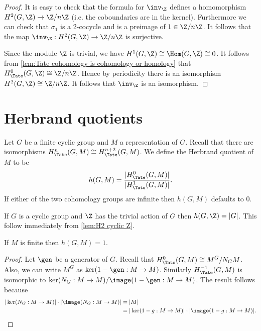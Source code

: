 \begin{proof}
	It is easy to check that the formula for $\inv_\Z$ defines a homomorphism
	$H^2(G,\Z) \to \Z / n \Z$ (i.e. the coboundaries are in the kernel).
	Furthermore we can check that $\sigma_1$ is a 2-cocycle
	and is a preimage of $1 \in \Z/n\Z$.
	It follows that the map $\inv_\Z : H^2(G,\Z) \to \Z/n\Z$ is surjective.

	Since the module $\Z$ is trivial, we have $H^1(G,\Z)\cong \Hom(G,\Z) \cong 0$.
	It follows from \ref{lem:Tate cohomology is cohomology or homology}
	that $H^0_{\Tate}(G,\Z) \cong \Z /n\Z$.
	Hence by periodicity there is an isomorphism $H^2(G,\Z) \cong \Z/ n\Z$.
	It follows that $\inv_\Z$ is an isomorphism.
\end{proof}





\section{Herbrand quotients}

\begin{definition} \label{def:herbrand quotient}
	Let $G$ be a finite cyclic group and $M$ a representation of $G$.
	Recall that there are isomorphisms $H^n_{\Tate}(G,M) \cong H^{n+2}_{\Tate}(G,M)$.
	We define the Herbrand quotient of $M$ to be
	\[
		h(G,M) = \frac{|H^0_{\Tate}(G,M)|}{|H^1_{\Tate}(G,M)|}.
	\]
	If either of the two cohomology groups are infinite then $h(G,M)$ defaults to $0$.
\end{definition}

\begin{example} \label{eg:herbrand Z}
	If $G$ is a cyclic group and $\Z$ has the trivial action of $G$ then $h(G,\Z) = |G|$.
	This follow immediately from \ref{lem:H2 cyclic Z}.
\end{example}


\begin{lemma} \label{lem:herbrand finite}
	If $M$ is finite then $h(G,M)=1$.
\end{lemma}

\begin{proof}
	Let $\gen$ be a generator of $G$.
	Recall that $H^0_{\Tate}(G,M) \cong M^G / N_GM$.
	Also, we can write $M^G$ as $\ker(1-\gen : M \to M)$.
	Similarly $H^{-1}_{\Tate}(G,M)$ is isomorphic to $\ker (N_G : M \to M) / \image (1-\gen : M \to M)$.
	The result follows because
	\begin{align*}
		|\ker(N_G : M \to M)| \cdot |\image(N_G : M \to M)|
		&=|M|\\
		&=|\ker(1-g : M \to M)| \cdot |\image(1-g : M \to M)|.
	\end{align*}
\end{proof}

